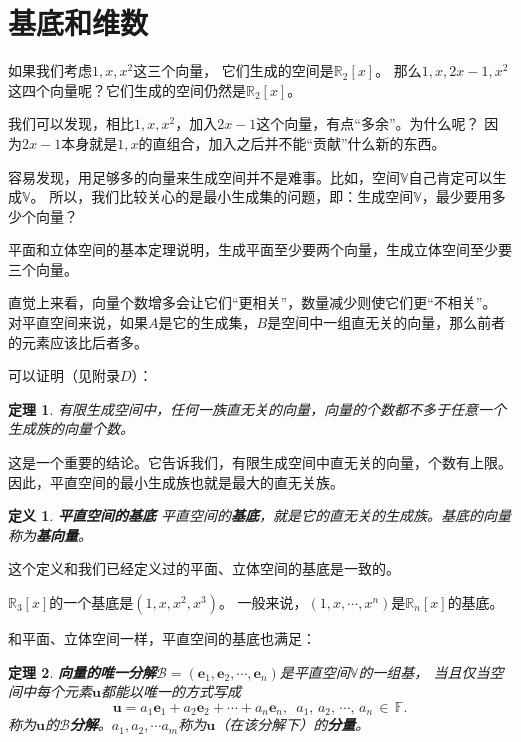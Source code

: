 \documentclass[12pt,UTF8]{ctexbook}
\newtheorem{df}{定义}[section]
\newtheorem{tm}{定理}[section]
\begin{document}
\section{基底和维数}

如果我们考虑$1,x,x^2$这三个向量，
它们生成的空间是$\mathbb{R}_2[x]$。
那么$1,x,2x-1,x^2$这四个向量呢？它们生成的空间仍然是$\mathbb{R}_2[x]$。

我们可以发现，相比$1,x,x^2$，加入$2x-1$这个向量，有点“多余”。为什么呢？
因为$2x-1$本身就是$1, x$的直组合，加入之后并不能“贡献”什么新的东西。

容易发现，用足够多的向量来生成空间并不是难事。比如，空间$\mathbb{V}$自己肯定可以生成$\mathbb{V}$。
所以，我们比较关心的是最小生成集的问题，即：生成空间$\mathbb{V}$，最少要用多少个向量？

平面和立体空间的基本定理说明，生成平面至少要两个向量，生成立体空间至少要三个向量。

直觉上来看，向量个数增多会让它们“更相关”，数量减少则使它们更“不相关”。
对平直空间来说，如果$A$是它的生成集，$B$是空间中一组直无关的向量，那么前者的元素应该比后者多。

可以证明（见附录$D$）：
\begin{tm}\label{tm:4-3-10}
    有限生成空间中，任何一族直无关的向量，向量的个数都不多于任意一个生成族的向量个数。
\end{tm}
这是一个重要的结论。它告诉我们，有限生成空间中直无关的向量，个数有上限。
因此，平直空间的最小生成族也就是最大的直无关族。

\begin{df}{\textbf{平直空间的基底}}
    平直空间的\textbf{基底}，就是它的直无关的生成族。基底的向量称为\textbf{基向量}。
\end{df}

这个定义和我们已经定义过的平面、立体空间的基底是一致的。

$\mathbb{R}_3[x]$的一个基底是$(1, x, x^2, x^3)$。
一般来说，$(1, x, \cdots, x^n)$是$\mathbb{R}_n[x]$的基底。

和平面、立体空间一样，平直空间的基底也满足：
\begin{tm}{\textbf{向量的唯一分解}}\label{tm:4-3-20}
    $ \mathcal{B} = (\mathbf{e}_1, \mathbf{e}_2, \cdots , \mathbf{e}_n )$是平直空间$\mathbb{V}$的一组基，
    当且仅当空间中每个元素$\mathbf{u}$都能以唯一的方式写成
    $$ \mathbf{u} = a_1\mathbf{e}_1 +a_2 \mathbf{e}_2 + \cdots + a_n\mathbf{e}_n, \,\,\, a_1,\,a_2,\,\cdots,\, a_n \,\in\,\mathbb{F}.$$
    称为$\mathbf{u}$的$\mathcal{B}$\textbf{分解}。$a_1, a_2, \cdots a_m$称为$\mathbf{u}$（在该分解下）的\textbf{分量}。
\end{tm}
\end{document}
